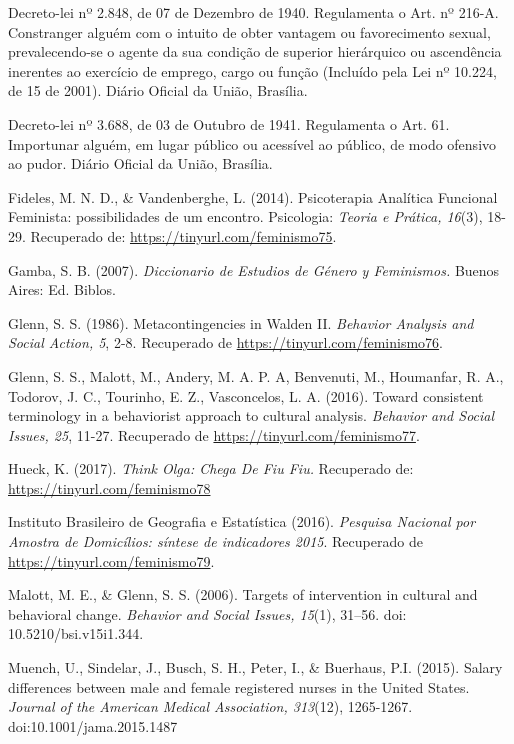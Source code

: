 \hangindent=25pt
\noindent Decreto-lei nº 2.848, de 07 de Dezembro de 1940. Regulamenta o Art. nº 216-A. Constranger alguém com o intuito de obter vantagem ou favorecimento sexual, prevalecendo-se o agente da sua condição de superior hierárquico ou ascendência inerentes ao exercício de emprego, cargo ou função (Incluído pela Lei nº 10.224, de 15 de 2001). Diário Oficial da União, Brasília.

\hangindent=25pt
\noindent Decreto-lei nº 3.688, de 03 de Outubro de 1941. Regulamenta o Art. 61. Importunar alguém, em lugar público ou acessível ao público, de modo ofensivo ao pudor. Diário Oficial da União, Brasília.

\hangindent=25pt
\noindent Fideles, M. N. D., \& Vandenberghe, L. (2014). Psicoterapia Analítica Funcional Feminista: possibilidades de um encontro. Psicologia: \textit{Teoria e Prática, 16}(3), 18-29. Recuperado de: \url{https://tinyurl.com/feminismo75}.

\hangindent=25pt
\noindent Gamba, S. B. (2007). \textit{Diccionario de Estudios de Género y Feminismos.} Buenos Aires: Ed. Biblos.

\hangindent=25pt
\noindent Glenn, S. S. (1986). Metacontingencies in Walden II. \textit{Behavior Analysis and Social Action, 5}, 2-8. Recuperado de \url{https://tinyurl.com/feminismo76}.

\hangindent=25pt
\noindent Glenn, S. S., Malott, M., Andery, M. A. P. A, Benvenuti, M., Houmanfar, R. A., Todorov, J. C., Tourinho, E. Z., Vasconcelos, L. A. (2016). Toward consistent terminology in a behaviorist approach to cultural analysis. \textit{Behavior and Social Issues, 25}, 11-27. Recuperado de \url{https://tinyurl.com/feminismo77}.

\hangindent=25pt
\noindent Hueck, K. (2017). \textit{Think Olga: Chega De Fiu Fiu.} Recuperado de: \url{https://tinyurl.com/feminismo78}

\hangindent=25pt
\noindent Instituto Brasileiro de Geografia e Estatística (2016). \textit{Pesquisa Nacional por Amostra de Domicílios: síntese de indicadores 2015}. Recuperado de \url{https://tinyurl.com/feminismo79}.

\hangindent=25pt
\noindent Malott, M. E., \& Glenn, S. S. (2006). Targets of intervention in cultural and behavioral change. \textit{Behavior and Social Issues, 15}(1), 31–56. doi: 10.5210/bsi.v15i1.344.

\hangindent=25pt
\noindent Muench, U., Sindelar, J., Busch, S. H., Peter, I., \& Buerhaus, P.I. (2015). Salary differences between male and female registered nurses in the United States. \textit{Journal of the American Medical Association, 313}(12), 1265-1267. doi:10.1001/jama.2015.1487 


